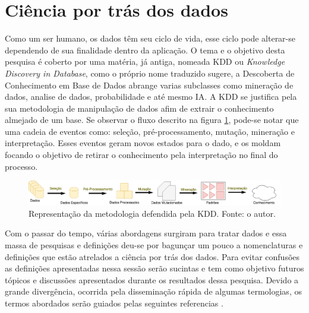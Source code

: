 \section{Ciência por trás dos dados}
Como um ser humano, os dados têm seu ciclo de vida, esse ciclo pode alterar-se dependendo de sua finalidade dentro da aplicação. O tema e o objetivo desta pesquisa é coberto por uma matéria, já antiga, nomeada KDD ou \textit{Knowledge Discovery in Database}, como o próprio nome traduzido sugere, a Descoberta de Conhecimento em Base de Dados abrange varias subclasses como mineração de dados, analise de dados, probabilidade e até mesmo IA. A KDD se justifica pela sua metodologia de manipulação de dados afim de extrair o conhecimento almejado de um base. Se observar o fluxo descrito na figura \ref{fig:kdd}, pode-se notar que uma cadeia de eventos como: seleção, pré-processamento, mutação, mineração e interpretação. Esses eventos geram novos estados para o dado, e os moldam focando o objetivo de retirar o conhecimento pela interpretação no final do processo.

\begin{figure}[H]
    \centering
    \includegraphics[width=.8\textwidth]{imagens/kdd.png}
    \caption{Representação da metodologia defendida pela KDD. Fonte: o autor.}
    \label{fig:kdd}
\end{figure}

Com o passar do tempo, várias abordagens surgiram para tratar dados e essa massa de pesquisas e definições deu-se por bagunçar um pouco a nomenclaturas e definições que estão atrelados a ciência por trás dos dados. Para evitar confusões as definições apresentadas nessa sessão serão sucintas e tem como objetivo futuros tópicos e discussões apresentados durante os resultados dessa pesquisa. Devido a grande divergência, ocorrida pela disseminação rápida de algumas termologias, os termos abordados serão guiados pelas seguintes referencias \cite{laender2002brief, fayyad1996kdd, hand2007principles}.





